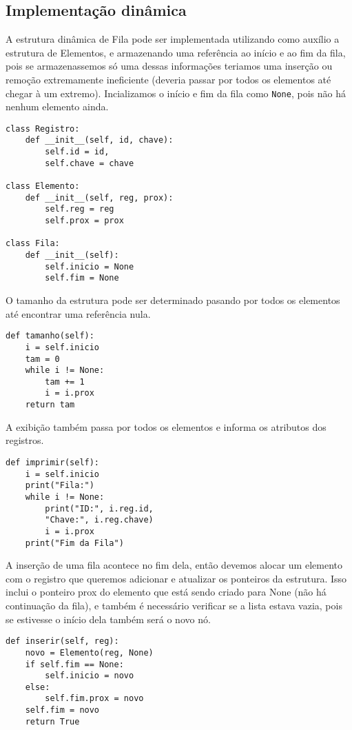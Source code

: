 \documentclass[a4paper, twocolumn]{article}
\theoremstyle{definition}
\begin{document}
\subsection{Implementação dinâmica}

A estrutura dinâmica de Fila pode ser implementada utilizando como auxílio a estrutura de Elementos, e armazenando uma referência ao início e ao fim da fila, pois se armazenassemos só uma dessas informações teriamos uma inserção ou remoção extremamente ineficiente (deveria passar por todos os elementos até chegar à um extremo). Incializamos o início e fim da fila como \texttt{None}, pois não há nenhum elemento ainda.
\begin{lstlisting}[label=fila_din_estrutura, caption= Fila dinâmica (estrutra)]
class Registro:
    def __init__(self, id, chave):
        self.id = id,
        self.chave = chave

class Elemento:
    def __init__(self, reg, prox):
        self.reg = reg
        self.prox = prox

class Fila:
    def __init__(self):
        self.inicio = None
        self.fim = None
\end{lstlisting}
      
O tamanho da estrutura pode ser determinado pasando por todos os elementos até encontrar uma referência nula.
\begin{lstlisting}[label=fila_din_tamanho, caption= Fila dinâmica (tamanho)]
def tamanho(self):
    i = self.inicio
    tam = 0
    while i != None:
        tam += 1
        i = i.prox
    return tam
\end{lstlisting}

A exibição também passa por todos os elementos e informa os atributos dos registros.
\begin{lstlisting}[label=fila_din_imprimir, caption= Fila dinâmica (exibição)]
def imprimir(self):
    i = self.inicio
    print("Fila:")
    while i != None:
        print("ID:", i.reg.id, 
        "Chave:", i.reg.chave)
        i = i.prox
    print("Fim da Fila")
\end{lstlisting}

A inserção de uma fila acontece no fim dela, então devemos alocar um elemento com o registro que queremos adicionar e atualizar os ponteiros da estrutura. Isso inclui o ponteiro prox do elemento que está sendo criado para None (não há continuação da fila), e também é necessário verificar se a lista estava vazia, pois se estivesse o início dela também será o novo nó. 
\begin{lstlisting}[label=fila_din_inserir, caption= Fila dinâmica (inserção)]
def inserir(self, reg):
    novo = Elemento(reg, None)
    if self.fim == None: 
        self.inicio = novo
    else:
        self.fim.prox = novo
    self.fim = novo
    return True
\end{lstlisting}
\end{document}
